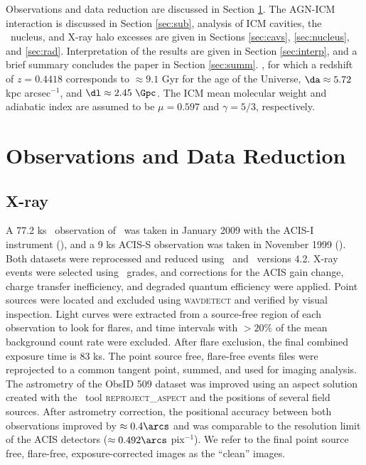 \documentclass[useAMS,usenatbib]{mn2e}
\begin{document}
Observations and data reduction are discussed in Section
\ref{sec:obs}. The AGN-ICM interaction is discussed in Section
\ref{sec:sub}, analysis of ICM cavities, the \irs\ nucleus, and X-ray
halo excesses are given in Sections \ref{sec:cavs}, \ref{sec:nucleus},
and \ref{sec:rad}. Interpretation of the results are given in Section
\ref{sec:interp}, and a brief summary concludes the paper in Section
\ref{sec:summ}. \LCDM, for which a redshift of $z = 0.4418$
corresponds to $\approx 9.1$ Gyr for the age of the Universe, $\da
\approx 5.72$ kpc arcsec$^{-1}$, and $\dl \approx 2.45~\Gpc$. The ICM
mean molecular weight and adiabatic index are assumed to be $\mu =
0.597$ and $\gamma = 5/3$, respectively.

\section{Observations and Data Reduction}
\label{sec:obs}

\subsection{X-ray}
\label{sec:xray}

A 77.2 ks \cxo\ observation of \irs\ was taken in January 2009 with
the ACIS-I instrument (),
and a 9 ks ACIS-S observation was taken in November 1999 (). Both datasets were reprocessed
and reduced using \ciao\ and \caldb\ versions 4.2. X-ray events were
selected using \asca\ grades, and corrections for the ACIS gain
change, charge transfer inefficiency, and degraded quantum efficiency
were applied. Point sources were located and excluded using
{\textsc{wavdetect}} and verified by visual inspection. Light curves
were extracted from a source-free region of each observation to look
for flares, and time intervals with $> 20\%$ of the mean background
count rate were excluded. After flare exclusion, the final combined
exposure time is 83 ks. The point source free, flare-free events files
were reprojected to a common tangent point, summed, and used for
imaging analysis. The astrometry of the ObsID 509 dataset was improved
using an aspect solution created with the \ciao\ tool
{\textsc{reproject\_aspect}} and the positions of several field
sources. After astrometry correction, the positional accuracy between
both observations improved by $\approx 0.4\arcs$ and was comparable to
the resolution limit of the ACIS detectors ($\approx 0.492\arcs$
pix$^{-1}$). We refer to the final point source free, flare-free,
exposure-corrected images as the ``clean'' images.
\end{document}
